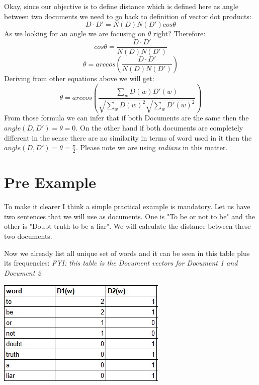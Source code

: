 \documentclass{article}
\begin{document}
    Okay, since our objective is to define distance which is defined here as angle between two documents we need to go back to definition of vector dot products:
    \begin{equation*}
        D \cdot D' = N(D) N(D') cos \theta
    \end{equation*}
    As we looking for an angle we are focusing on $\theta$ right?
    Therefore:
    \begin{equation*}
        cos \theta = \frac{D \cdot D'}{N(D)N(D')}
    \end{equation*}
    \begin{equation*}
        \theta = arccos \left( \frac{D \cdot D'}{N(D)N(D')} \right)
    \end{equation*}
    Deriving from other equations above we will get:
    \[
      \theta = arccos \left( \frac{\sum_{w}{D(w)D'(w)}}{\sqrt{\sum_{w}{D(w)^{2}}} \sqrt{\sum_{w}{D'(w)^{2}}}}\right)  
    \]
    From those formula we can infer that if both Documents are the same then the $angle(D,D') = \theta = 0$.
    On the other hand if both documents are completely different in the sense there are no similarity in terms of word used in it then the $angle(D,D') = \theta = \frac{\pi}{2}$. Please note we are using \emph{radians} in this matter.

    \section*{Pre Example}
    To make it clearer I think a simple practical example is mandatory. 
    Let us have two sentences that we will use as documents. 
    One is "To be or not to be" and the other is "Doubt truth to be a liar". 
    We will calculate the distance between these two documents.

    Now we already list all unique set of words and it can be seen in this table plus its frequencies: 
    \textit{FYI: this table is the Document vectors for Document 1 and Document 2}
    \begin{center}
        \includegraphics{table word frequencies}    
    \end{center}
        
\end{document}
